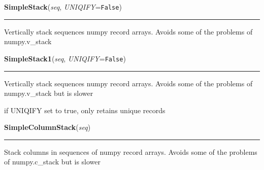    \vspace{0.5ex}

\hspace{.8\funcindent}\begin{boxedminipage}{\funcwidth}

    \raggedright \textbf{SimpleStack}(\textit{seq}, \textit{UNIQIFY}={\tt False})

    \vspace{-1.5ex}

    \rule{\textwidth}{0.5\fboxrule}
\setlength{\parskip}{2ex}
    Vertically stack sequences numpy record arrays. Avoids some of the 
    problems of numpy.v\_stack

\setlength{\parskip}{1ex}
    \end{boxedminipage}

    \label{System:Utils:SimpleStack1}

    \vspace{0.5ex}

\hspace{.8\funcindent}\begin{boxedminipage}{\funcwidth}

    \raggedright \textbf{SimpleStack1}(\textit{seq}, \textit{UNIQIFY}={\tt False})

    \vspace{-1.5ex}

    \rule{\textwidth}{0.5\fboxrule}
\setlength{\parskip}{2ex}
    Vertically stack sequences numpy record arrays. Avoids some of the 
    problems of numpy.v\_stack but is slower

    if UNIQIFY set to true, only retains unique records

\setlength{\parskip}{1ex}
    \end{boxedminipage}

    \label{System:Utils:SimpleColumnStack}

    \vspace{0.5ex}

\hspace{.8\funcindent}\begin{boxedminipage}{\funcwidth}

    \raggedright \textbf{SimpleColumnStack}(\textit{seq})

    \vspace{-1.5ex}

    \rule{\textwidth}{0.5\fboxrule}
\setlength{\parskip}{2ex}
    Stack columns in sequences of numpy record arrays. Avoids some of the 
    problems of numpy.c\_stack but is slower

\setlength{\parskip}{1ex}
    \end{boxedminipage}

